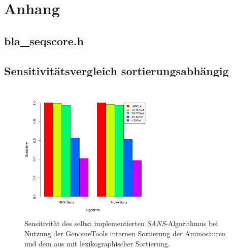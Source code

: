 \documentclass{article}
\begin{document}
{}

\pagebreak
\section{Anhang}
\subsection*{bla\_seqscore.h}

\subsection{Sensitivitätsvergleich sortierungsabhängig}
\begin{figure}[h]
  \begin{center}
    \includegraphics[width=0.6\textwidth]{img/barplot_gtsort.png}
    \caption{Sensitivität des selbst implementierten \emph{SANS}-Algorithmus bei Nutzung der GenomeTools internen Sortierung der Aminosäuren und dem aus \cite{Holm} mit lexikographischer
      Sortierung.} 
    \label{barplot_sup}
  \end{center}
\end{figure}
\end{document}
